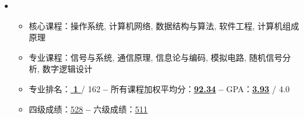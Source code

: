 \renewcommand{\ULthickness}{1pt}                  %
  \begin{itemize}[leftmargin=*]

    \item
      {\small
      \begin{itemize}
         \item{核心课程：操作系统, 计算机网络, 数据结构与算法, 软件工程, 计算机组成原理}
         \item{专业课程：信号与系统, 通信原理, 信息论与编码, 模拟电路, 随机信号分析, 数字逻辑设计}
         
        \item{专业排名：\uline{\textbf{ 1 }} / 162 \hspace*{1cm} {\bfseries -- }所有课程加权平均分：\uline{\textbf{92.34}} \hspace*{1cm} {\bfseries -- }GPA：\uline{\textbf{3.93}} / 4.0}
        \item{四级成绩：\underline{528}\hspace*{2cm} {\bfseries -- }六级成绩：\underline{511}}

      \end{itemize}
      

      }
  \end{itemize}